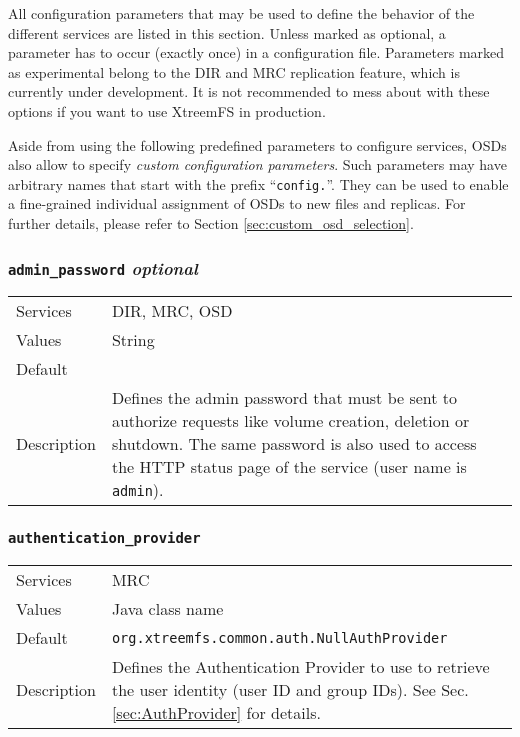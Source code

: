 \documentclass[a4paper,10pt]{book}
\begin{document}
All configuration parameters that may be used to define the behavior of the different services are listed in this section. Unless marked as optional, a parameter has to occur (exactly once) in a configuration file. Parameters marked as experimental belong to the DIR and MRC replication feature, which is currently under development. It is not recommended to mess about with these options if you want to use XtreemFS in production.

Aside from using the following predefined parameters to configure services, OSDs also allow to specify \emph{custom configuration parameters}. Such parameters may have arbitrary names that start with the prefix ``\texttt{config.}''. They can be used to enable a fine-grained individual assignment of OSDs to new files and replicas. For further details, please refer to Section \ref{sec:custom_osd_selection}.


\subsubsection{\texttt{admin\_password} \textit{optional}}
\begin{tabular}{lp{10cm}}
 Services & DIR, MRC, OSD\\
 Values   & String \\
 Default  & \\
 Description & Defines the admin password that must be sent to authorize requests like volume creation, deletion or shutdown. The same password is also used to access the HTTP status page of the service (user name is \texttt{admin}).
\end{tabular}

\subsubsection{\texttt{authentication\_provider}}
\begin{tabular}{lp{10cm}}
 Services & MRC\\
 Values   & Java class name \\
 Default  & \texttt{org.xtreemfs.common.auth.NullAuthProvider}\\
 Description & Defines the Authentication Provider to use to retrieve the user identity (user ID and group IDs). See Sec. \ref{sec:AuthProvider} for details.
\end{tabular}
\end{document}

